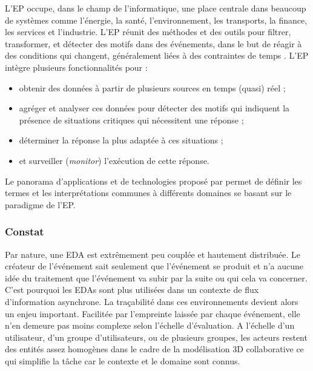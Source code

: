 L'\gls{EP} occupe, dans le champ de l'informatique, une place centrale dans 
beaucoup de systèmes comme l'énergie, la santé, l'environnement, les transports, 
la finance, les services et l'industrie. L'\gls{EP} réunit des méthodes et des outils 
pour filtrer, transformer, et détecter des motifs dans des événements, dans le but 
de réagir à des conditions qui changent, généralement liées à des contraintes de 
temps \cite{Chandy2011}. L'\gls{EP} intègre plusieurs fonctionnalités pour :
\begin{itemize}
	\item obtenir des données à partir de plusieurs sources en temps (quasi) réel ;
	\item agréger et analyser ces données pour détecter des motifs qui indiquent la 
	présence de situations critiques qui nécessitent une réponse ;
	\item déterminer la réponse la plus adaptée à ces situations ;
	\item et surveiller (\textit{monitor}) l'exécution de cette réponse.
\end{itemize}

Le panorama d'applications et de technologies proposé par \cite{Hinze2009} 
permet de définir les termes et les interprétations communes à différents 
domaines se basant sur le paradigme de l'\gls{EP}. 





\subsubsection{Constat}

Par nature, une \gls{EDA} est extrêmement peu couplée et 
hautement distribuée. Le créateur de l'événement sait seulement que l'événement 
se produit et n'a aucune idée du traitement que l'événement va subir par 
la suite ou qui cela va concerner. 
C'est pourquoi les \glspl{EDA} sont plus utilisées dans un 
contexte de flux d'information asynchrone. La traçabilité dans ces environnements 
devient alors un enjeu important. Facilitée par l'empreinte laissée par chaque 
événement, elle n'en demeure pas moins complexe selon l'échelle d'évaluation. A 
l'échelle d'un utilisateur, d'un groupe d'utilisateurs, ou de plusieurs groupes, les 
acteurs restent des entités assez homogènes dans le cadre de la modélisation 3D 
collaborative ce qui simplifie la tâche car le contexte et le domaine sont 
connus.




